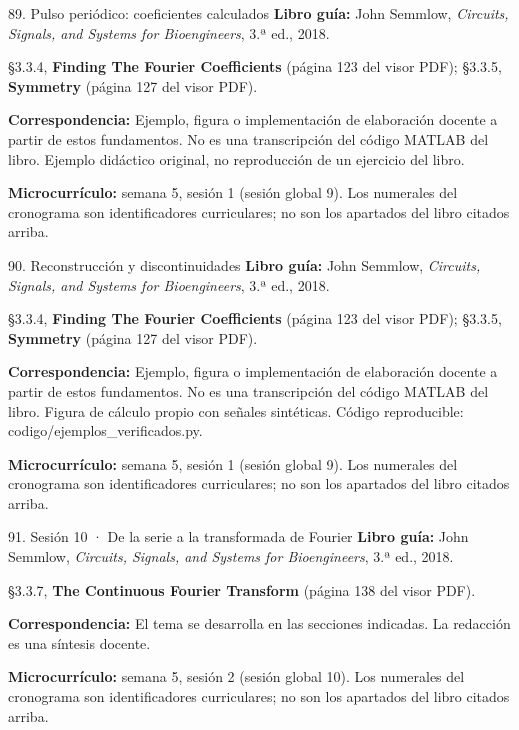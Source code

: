 \documentclass[
  10pt,
  ignorenonframetext,
  aspectratio=169,
  spanish,
]{beamer}
\begin{document}
\begin{frame}{89. Pulso periódico: coeficientes calculados}
\label{pulso-periuxf3dico-coeficientes-calculados}
\textbf{Libro guía:} John Semmlow, \emph{Circuits, Signals, and Systems
for Bioengineers}, 3.ª ed., 2018.

§3.3.4, \textbf{Finding The Fourier Coefficients} (página 123 del visor
PDF); §3.3.5, \textbf{Symmetry} (página 127 del visor PDF).

\textbf{Correspondencia:} Ejemplo, figura o implementación de
elaboración docente a partir de estos fundamentos. No es una
transcripción del código MATLAB del libro. Ejemplo didáctico original,
no reproducción de un ejercicio del libro.

\textbf{Microcurrículo:} semana 5, sesión 1 (sesión global 9). Los
numerales del cronograma son identificadores curriculares; no son los
apartados del libro citados arriba.
\end{frame}

\begin{frame}{90. Reconstrucción y discontinuidades}
\label{reconstrucciuxf3n-y-discontinuidades}
\textbf{Libro guía:} John Semmlow, \emph{Circuits, Signals, and Systems
for Bioengineers}, 3.ª ed., 2018.

§3.3.4, \textbf{Finding The Fourier Coefficients} (página 123 del visor
PDF); §3.3.5, \textbf{Symmetry} (página 127 del visor PDF).

\textbf{Correspondencia:} Ejemplo, figura o implementación de
elaboración docente a partir de estos fundamentos. No es una
transcripción del código MATLAB del libro. Figura de cálculo propio con
señales sintéticas. Código reproducible:
codigo/ejemplos\_verificados.py.

\textbf{Microcurrículo:} semana 5, sesión 1 (sesión global 9). Los
numerales del cronograma son identificadores curriculares; no son los
apartados del libro citados arriba.
\end{frame}

\begin{frame}{91. Sesión 10 · De la serie a la transformada de Fourier}
\label{sesiuxf3n-10-de-la-serie-a-la-transformada-de-fourier}
\textbf{Libro guía:} John Semmlow, \emph{Circuits, Signals, and Systems
for Bioengineers}, 3.ª ed., 2018.

§3.3.7, \textbf{The Continuous Fourier Transform} (página 138 del visor
PDF).

\textbf{Correspondencia:} El tema se desarrolla en las secciones
indicadas. La redacción es una síntesis docente.

\textbf{Microcurrículo:} semana 5, sesión 2 (sesión global 10). Los
numerales del cronograma son identificadores curriculares; no son los
apartados del libro citados arriba.
\end{frame}
\end{document}
